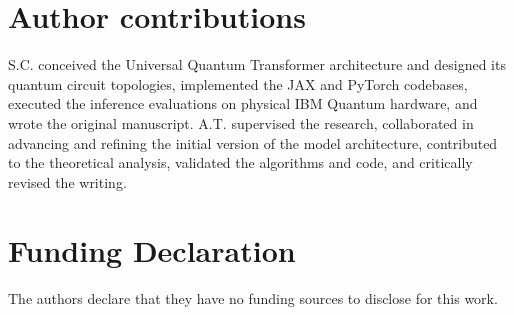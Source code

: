 \documentclass[11pt, a4paper]{article}
\begin{document}
\renewcommand{\refname}{References}



\section*{Author contributions}
S.C. conceived the Universal Quantum Transformer architecture and designed its quantum circuit topologies, implemented the JAX and PyTorch codebases, executed the inference evaluations on physical IBM Quantum hardware, and wrote the original manuscript. A.T. supervised the research, collaborated in advancing and refining the initial version of the model architecture, contributed to the theoretical analysis, validated the algorithms and code, and critically revised the writing.

\section*{Funding Declaration}
The authors declare that they have no funding sources to disclose for this work.
\end{document}
